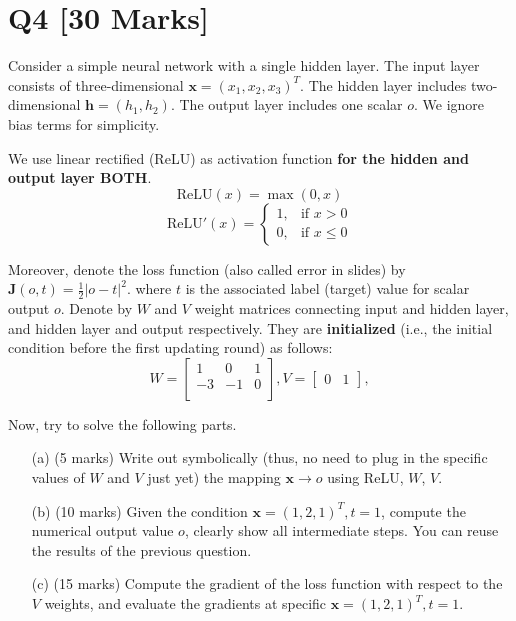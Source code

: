 \section*{Q4 [30 Marks]}

Consider a simple neural network with a single hidden layer. 
The input layer consists of three-dimensional \( \mathbf{x} = (x_1, x_2, x_3)^T \). 
The hidden layer includes two-dimensional \( \mathbf{h} = (h_1, h_2) \). 
The output layer includes one scalar \( o \). 
We ignore bias terms for simplicity.

We use linear rectified (ReLU) as activation function \textbf{for the hidden and output layer BOTH}.
\begin{equation*}
    \text{ReLU}(x) = \max(0, x)
\end{equation*}
\begin{equation*}
    \text{ReLU}'(x) = 
        \begin{cases} 
        1, & \text{if } x > 0 \\
        0, & \text{if } x \leq 0 
        \end{cases}
\end{equation*}

Moreover, denote the loss function (also called error in slides) by \( \mathbf{J}(o, t) = \frac{1}{2} |o - t|^2 \).
where \( t \) is the associated label (target) value for scalar output \( o \).
Denote by \( W \) and \( V \) weight matrices connecting input and hidden layer, and hidden layer and output respectively.
They are \textbf{initialized} (i.e., the initial condition before the first updating round) as follows:
\begin{equation}
W = \begin{bmatrix}
1 & 0 & 1 \\
-3 & -1 & 0 \\
\end{bmatrix}, 
V = \begin{bmatrix}
0 & 1
\end{bmatrix},
\end{equation}

Now, try to solve the following parts.

\begin{itemize}
    \item[(a)] (5 marks) Write out symbolically (thus, no need to plug in the specific values of \( W \) and \( V \) just yet) the mapping \( \mathbf{x} \rightarrow o \) using ReLU, \( W \), \( V \).
    \item[(b)] (10 marks) Given the condition \( \mathbf{x} = (1, 2, 1)^T, t = 1 \), compute the numerical output value \( o \), clearly show all intermediate steps. You can reuse the results of the previous question.
    \item[(c)] (15 marks) Compute the gradient of the loss function with respect to the \( V \) weights, and evaluate the gradients at specific \( \mathbf{x} = (1, 2, 1)^T, t = 1 \).
\end{itemize}

